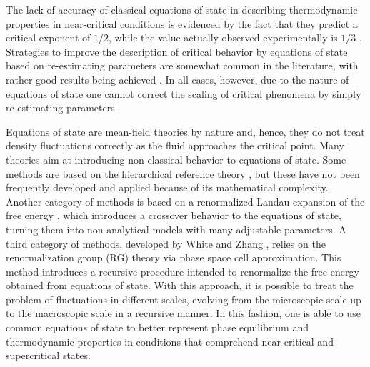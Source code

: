\documentclass[preprint,12pt,3p]{elsarticle}
\begin{document}
The lack of accuracy of classical equations of state in describing thermodynamic properties in near-critical conditions is evidenced by the fact that they predict a critical exponent of $1/2$, while the value actually observed experimentally is $1/3$ \cite{sengers1974van,wyczalkowska2004critical,stanley1999scaling}.
Strategies to improve the description of critical behavior by equations of state based on re-estimating parameters are somewhat common in the literature, with rather good results being achieved \cite{palma2017re,vinhal2017evaluation}.
In all cases, however, due to the nature of equations of state one cannot correct the scaling of critical phenomena by simply re-estimating parameters.

Equations of state are mean-field theories by nature and, hence, they do not treat density fluctuations correctly as the fluid approaches the critical point.
Many theories aim at introducing non-classical behavior to equations of state.
Some methods are based on the hierarchical reference theory \cite{parola1984liquid, parola1985hierarchical, meroni1990differential, meroni1993differential}, but these have not been frequently developed and applied because of its mathematical complexity.
Another category of methods is based on a renormalized Landau expansion of the free energy \cite{wyczalkowska2004critical, chen1990crossover, kiselev1991universal, kiselev1998cubic, anisimov1992crossover, kiselev1999cubic, kiselev1999crossover}, which introduces a crossover behavior to the equations of state, turning them into non-analytical models with many adjustable parameters.
A third category of methods, developed by White and Zhang \cite{white1993renormalization, white1995renormalization, white1998renormalization}, relies on the renormalization group (RG) theory via phase space cell approximation.
This method introduces a recursive procedure intended to renormalize the free energy obtained from equations of state.
With this approach, it is possible to treat the problem of fluctuations in different scales, evolving from the microscopic scale up to the macroscopic scale in a recursive manner.
In this fashion, one is able to use common equations of state to better represent phase equilibrium and thermodynamic properties in conditions that comprehend near-critical and supercritical states.
\end{document}
